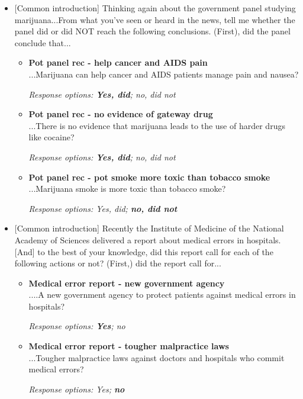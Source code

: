 \documentclass[12pt, letterpaper]{article}
\begin{document}
\begin{itemize}
\item {[Common introduction] Thinking again about the government panel studying marijuana...From what you've seen or heard in the news, tell me whether the panel did or did NOT reach the following conclusions. (First), did the panel conclude that...

   \begin{itemize}
\item \textbf{Pot panel rec - help cancer and AIDS pain} \\
...Marijuana can help cancer and AIDS patients manage pain and nausea?

\textit{Response options: \textbf{Yes, did}; no, did not}
\end{itemize}

   \begin{itemize}
\item \textbf{Pot panel rec - no evidence of gateway drug} \\
...There is no evidence that marijuana leads to the use of harder drugs like cocaine?

\textit{Response options: \textbf{Yes, did}; no, did not}
\end{itemize}

   \begin{itemize}
\item \textbf{Pot panel rec - pot smoke more toxic than tobacco smoke} \\
...Marijuana smoke is more toxic than tobacco smoke?

\textit{Response options: Yes, did; \textbf{no, did not}}
\end{itemize}}
\end{itemize}

\begin{itemize}
\item{[Common introduction] Recently the Institute of Medicine of the National Academy of Sciences delivered a report about medical errors in hospitals. [And] to the best of your knowledge, did this report call for each of the following actions or not? (First,) did the report call for...

   \begin{itemize}
\item \textbf{Medical error report - new government agency} \\
....A new government agency to protect patients against medical errors in hospitals?

\textit{Response options: \textbf{Yes}; no}
\end{itemize}

   \begin{itemize}
\item \textbf{Medical error report - tougher malpractice laws} \\
...Tougher malpractice laws against doctors and hospitals who commit medical errors?

\textit{Response options: Yes; \textbf{no}}
\end{itemize}}
\end{itemize}
\end{document}
